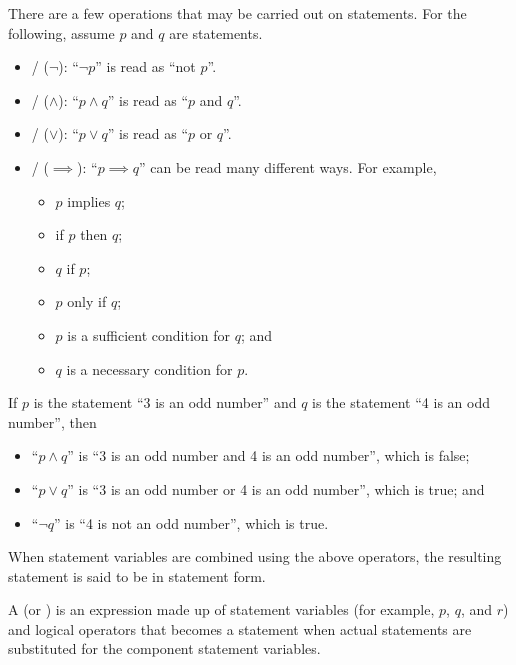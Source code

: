 There are a few operations that may be carried out on statements. For the following, assume $p$ and $q$ are statements.
\begin{itemize}
    \item {}/ ($\lnot$): ``$\lnot p$'' is read as ``not $p$''.
    \item {}/ ($\land$): ``$p\land q$'' is read as ``$p$ and $q$''.
    \item {}/ ($\lor$): ``$p\lor q$'' is read as ``$p$ or $q$''.
    \item {}/ ($\implies$): ``$p \implies q$'' can be read many different ways. For example,
    \begin{itemize}
        \item $p$ implies $q$;
        \item if $p$ then $q$;
        \item $q$ if $p$;
        \item $p$ only if $q$;
        \item $p$ is a sufficient condition for $q$; and
        \item $q$ is a necessary condition for $p$.
    \end{itemize}
\end{itemize}

\begin{example}
    If $p$ is the statement ``3 is an odd number'' and $q$ is the statement ``4 is an odd number'', then
    \begin{itemize}
        \item ``$p\land q$'' is ``3 is an odd number and 4 is an odd number'', which is false;
        \item ``$p\lor q$'' is ``3 is an odd number or 4 is an odd number'', which is true; and
        \item ``$\lnot q$'' is ``4 is not an odd number'', which is true.
    \end{itemize}
\end{example}

When statement variables are combined using the above operators, the resulting statement is said to be in statement form.
\begin{definition}
    A  (or ) is an expression made up of statement variables (for example, $p$, $q$, and $r$) and logical operators that becomes a statement when actual statements are substituted for the component statement variables.
\end{definition}

